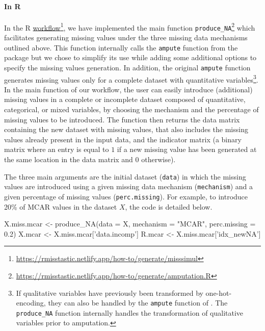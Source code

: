 \paragraph*{In {R}} In the {R} \href{https://rmisstastic.netlify.app/how-to/generate/misssimul}{workflow}\footnote{\url{https://rmisstastic.netlify.app/how-to/generate/misssimul}}, we have implemented the main function \texttt{produce\_NA}\footnote{\url{https://rmisstastic.netlify.app/how-to/generate/amputation.R}} which facilitates generating missing values under the three missing data mechanisms outlined above. This function internally calls the \texttt{ampute} function from the  package \citep{mice} but we chose to simplify its use while adding some additional options to specify the missing values generation. In addition, the original \texttt{ampute} function generates missing values only for a complete dataset with quantitative variables\footnote{If qualitative variables have previously been transformed by one-hot-encoding, they can also be handled by the \texttt{ampute} function of . The \texttt{produce\_NA} function internally handles the transformation of qualitative variables prior to amputation.}. In the main function of our workflow, the user can easily introduce (additional) missing values in a complete or incomplete dataset composed of quantitative, categorical, or mixed variables, by choosing the mechanism and the percentage of missing values to be introduced. The function then returns the data matrix containing the new dataset with missing values,
that also includes the missing values already present in the input data, and the indicator matrix (a binary matrix where an entry is equal to $1$ if a new missing value has been generated at the same location in the data matrix and $0$ otherwise). 

The three main arguments are the initial dataset (\texttt{data}) in which the missing values are introduced using a given missing data mechanism (\texttt{mechanism}) and a given percentage of missing values (\texttt{perc.missing}). For example, to introduce 20\% of MCAR values in the dataset $X$, the code is detailed below. 
\begin{example}
X.miss.mcar <- produce_NA(data = X, mechanism = "MCAR", perc.missing = 0.2)
X.mcar <- X.miss.mcar['data.incomp']
R.mcar <- X.miss.mcar['idx_newNA']
\end{example}

